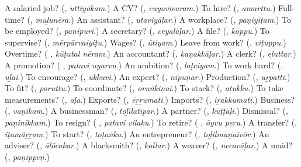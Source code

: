 \begin{tcolorbox}[breakable,colback=teal!4,colframe=teal!35!black,title={Before you move on}]
A salaried job? (\textbf{}, \emph{uttiyōkam}.) A CV? (\textbf{}, \emph{cuyavivaram}.) To hire? (\textbf{}, \emph{amarttu}.) Full-time? (\textbf{}, \emph{muḻunēra}.) An assistant? (\textbf{}, \emph{utaviyāḷar}.) A workplace? (\textbf{}, \emph{paṇiyiṭam}.) To be employed? (\textbf{}, \emph{paṇipuri}.) A secretary? (\textbf{}, \emph{ceyalāḷar}.) A file? (\textbf{}, \emph{kōppu}.) To supervise? (\textbf{}, \emph{mēṟpārvaiyiṭu}.) Wages? (\textbf{}, \emph{ūtiyam}.) Leave from work? (\textbf{}, \emph{viṭuppu}.) Overtime? (\textbf{ }, \emph{kūṭutal nēram}.) An accountant? (\textbf{}, \emph{kaṇakkāḷar}.) A clerk? (\textbf{}, \emph{eḻuttar}.) A promotion? (\textbf{ }, \emph{patavi uyarvu}.) An ambition? (\textbf{}, \emph{laṭciyam}.) To work hard? (\textbf{}, \emph{uḻai}.) To encourage? (\textbf{}, \emph{ūkkuvi}.) An expert? (\textbf{}, \emph{nipuṇar}.) Production? (\textbf{}, \emph{uṟpatti}.) To fit? (\textbf{}, \emph{poruttu}.) To coordinate? (\textbf{}, \emph{oruṅkiṇai}.) To stack? (\textbf{}, \emph{aṭukku}.) To take measurements? (\textbf{}, \emph{aḷa}.) Exports? (\textbf{}, \emph{ēṟṟumati}.) Imports? (\textbf{}, \emph{iṟakkumati}.) Business? (\textbf{}, \emph{vaṇikam}.) A businessman? (\textbf{}, \emph{toḻilatipar}.) A partner? (\textbf{}, \emph{kūṭṭāḷi}.) Dismissal? (\textbf{}, \emph{paṇinīkkam}.) To resign? (\textbf{ }, \emph{patavi vilaku}.) To retire? (\textbf{ }, \emph{ōyvu peṟu}.) A transfer? (\textbf{}, \emph{iṭamāṟṟam}.) To start? (\textbf{}, \emph{toṭaṅku}.) An entrepreneur? (\textbf{}, \emph{toḻilmuṉaivōr}.) An adviser? (\textbf{}, \emph{ālōcakar}.) A blacksmith? (\textbf{}, \emph{kollar}.) A weaver? (\textbf{}, \emph{necavāḷar}.) A maid? (\textbf{}, \emph{paṇippeṇ}.)
\end{tcolorbox}
